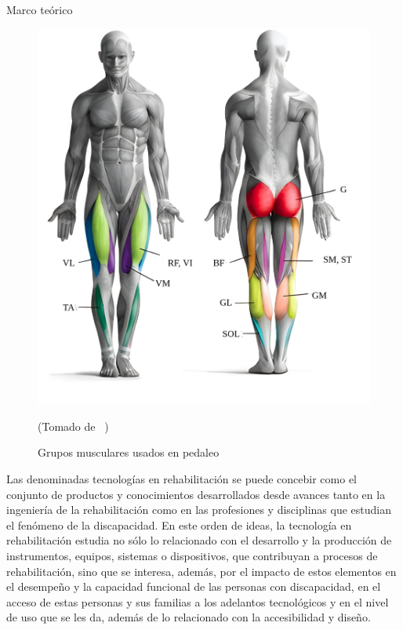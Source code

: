 \begin{thesischapter}{1} {Marco teórico}
    \begin{figure}[ht]
        \centering
        \includegraphics[scale=0.2]{images/musculegroups.png}
        \caption{Grupos musculares usados en pedaleo}
        (Tomado de ~\cite{Quémúsc72})
        \label{fig: musculegroups}
    \end{figure}

    \vspace{10pt}
    Las denominadas tecnologías en rehabilitación se puede concebir como el conjunto de productos y conocimientos
    desarrollados desde avances tanto en la ingeniería de la rehabilitación como en las profesiones y disciplinas 
    que estudian el fenómeno de la discapacidad. En este orden de ideas, la tecnología en rehabilitación estudia 
    no sólo lo relacionado con el desarrollo y la producción de instrumentos, equipos, sistemas o dispositivos, 
    que contribuyan a procesos de rehabilitación, sino que se interesa, además, por el impacto de estos elementos en el desempeño y la capacidad funcional de las personas con discapacidad, en el acceso
    de estas personas y sus familias a los adelantos tecnológicos y en el nivel de uso que se les da,
    además de lo relacionado con la accesibilidad y diseño.\cite{matheus1990tecnologia}


\end{thesischapter}
